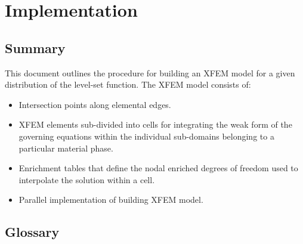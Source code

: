 \section{Implementation}
\label{implementation}


\subsection{Summary}

This document outlines the procedure for building an XFEM model for a given distribution of the level-set function. The XFEM model consists of:
\begin{itemize}
\item Intersection points along elemental edges.
\item XFEM elements sub-divided into cells for integrating the weak form of the governing equations within the individual sub-domains belonging to a particular material phase.
\item Enrichment tables that define the nodal enriched degrees of freedom used to interpolate the solution within a cell.
\item Parallel implementation of building XFEM model.
\end{itemize}


\subsection{Glossary}


